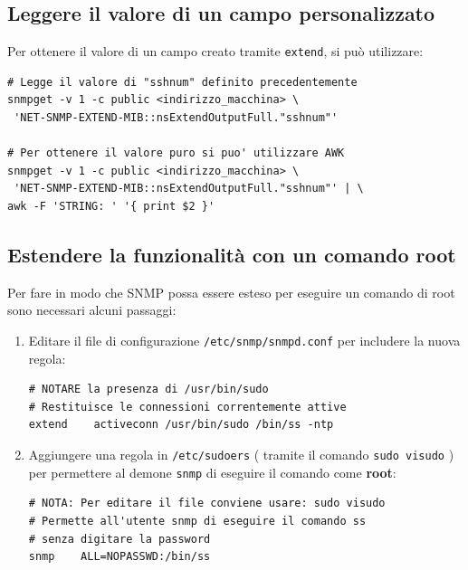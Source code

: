 \documentclass[a4paper]{report}
\newenvironment{code}{\begin{tcolorbox}[size=small]}{\end{tcolorbox}}
\begin{document}
\subsection{Leggere il valore di un campo personalizzato}

Per ottenere il valore di un campo creato tramite \texttt{extend}, si può utilizzare:
\begin{code}
\begin{lstlisting}
# Legge il valore di "sshnum" definito precedentemente
snmpget -v 1 -c public <indirizzo_macchina> \
 'NET-SNMP-EXTEND-MIB::nsExtendOutputFull."sshnum"'

# Per ottenere il valore puro si puo' utilizzare AWK
snmpget -v 1 -c public <indirizzo_macchina> \
 'NET-SNMP-EXTEND-MIB::nsExtendOutputFull."sshnum"' | \
awk -F 'STRING: ' '{ print $2 }' 
\end{lstlisting}
\end{code}

\subsection{Estendere la funzionalità con un comando root}

Per fare in modo che SNMP possa essere esteso per eseguire un comando di root sono necessari alcuni passaggi:

\begin{enumerate}
	\item Editare il file di configurazione \texttt{/etc/snmp/snmpd.conf} per includere la nuova regola:
	\begin{code}
\begin{lstlisting}
# NOTARE la presenza di /usr/bin/sudo
# Restituisce le connessioni correntemente attive
extend    activeconn /usr/bin/sudo /bin/ss -ntp
\end{lstlisting}
	\end{code}
	\item Aggiungere una regola in \texttt{/etc/sudoers} ( tramite il comando \texttt{sudo visudo} ) per permettere al demone \texttt{snmp} di eseguire il comando come \textbf{root}:
		\begin{code}
\begin{lstlisting}
# NOTA: Per editare il file conviene usare: sudo visudo
# Permette all'utente snmp di eseguire il comando ss
# senza digitare la password
snmp	ALL=NOPASSWD:/bin/ss
\end{lstlisting}
	\end{code}
\end{enumerate}
\end{document}
